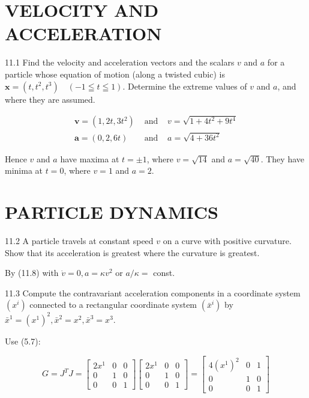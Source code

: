 \documentclass[10pt]{article}
\begin{document}
\section*{VELOCITY AND ACCELERATION}
11.1 Find the velocity and acceleration vectors and the scalars $v$ and $a$ for a particle whose equation of motion (along a twisted cubic) is $\mathbf{x}=\left(t, t^{2}, t^{3}\right) \quad(-1 \leqq t \leqq 1)$. Determine the extreme values of $v$ and $a$, and where they are assumed.

$$
\begin{array}{lll}
\mathbf{v}=\left(1,2 t, 3 t^{2}\right) & \text { and } & v=\sqrt{1+4 t^{2}+9 t^{4}} \\
\mathbf{a}=(0,2,6 t) & \text { and } & a=\sqrt{4+36 t^{2}}
\end{array}
$$

Hence $v$ and $a$ have maxima at $t= \pm 1$, where $v=\sqrt{14}$ and $a=\sqrt{40}$. They have minima at $t=0$, where $v=1$ and $a=2$.

\section*{PARTICLE DYNAMICS}
11.2 A particle travels at constant speed $v$ on a curve with positive curvature. Show that its acceleration is greatest where the curvature is greatest.

By (11.8) with $\dot{v}=0, a=\kappa v^{2}$ or $a / \kappa=$ const.

11.3 Compute the contravariant acceleration components in a coordinate system $\left(x^{i}\right)$ connected to a rectangular coordinate system $\left(\bar{x}^{i}\right)$ by $\bar{x}^{1}=\left(x^{1}\right)^{2}, \bar{x}^{2}=x^{2}, \bar{x}^{3}=x^{3}$.

Use (5.7):

$$
G=J^{T} J=\left[\begin{array}{ccc}
2 x^{1} & 0 & 0 \\
0 & 1 & 0 \\
0 & 0 & 1
\end{array}\right]\left[\begin{array}{ccc}
2 x^{1} & 0 & 0 \\
0 & 1 & 0 \\
0 & 0 & 1
\end{array}\right]=\left[\begin{array}{ccc}
4\left(x^{1}\right)^{2} & 0 & 1 \\
0 & 1 & 0 \\
0 & 0 & 1
\end{array}\right]
$$
\end{document}
